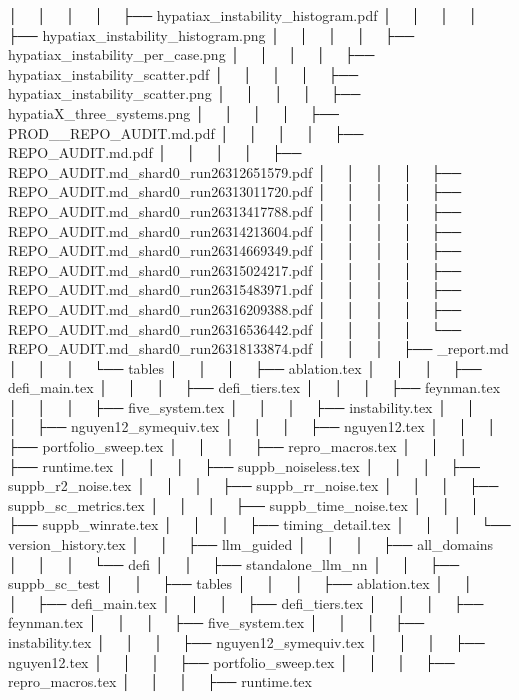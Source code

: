 │   │       │       │   ├── hypatiax_instability_histogram.pdf
│   │       │       │   ├── hypatiax_instability_histogram.png
│   │       │       │   ├── hypatiax_instability_per_case.png
│   │       │       │   ├── hypatiax_instability_scatter.pdf
│   │       │       │   ├── hypatiax_instability_scatter.png
│   │       │       │   ├── hypatiaX_three_systems.png
│   │       │       │   ├── PROD__REPO_AUDIT.md.pdf
│   │       │       │   ├── REPO_AUDIT.md.pdf
│   │       │       │   ├── REPO_AUDIT.md_shard0_run26312651579.pdf
│   │       │       │   ├── REPO_AUDIT.md_shard0_run26313011720.pdf
│   │       │       │   ├── REPO_AUDIT.md_shard0_run26313417788.pdf
│   │       │       │   ├── REPO_AUDIT.md_shard0_run26314213604.pdf
│   │       │       │   ├── REPO_AUDIT.md_shard0_run26314669349.pdf
│   │       │       │   ├── REPO_AUDIT.md_shard0_run26315024217.pdf
│   │       │       │   ├── REPO_AUDIT.md_shard0_run26315483971.pdf
│   │       │       │   ├── REPO_AUDIT.md_shard0_run26316209388.pdf
│   │       │       │   ├── REPO_AUDIT.md_shard0_run26316536442.pdf
│   │       │       │   └── REPO_AUDIT.md_shard0_run26318133874.pdf
│   │       │       ├── _report.md
│   │       │       └── tables
│   │       │           ├── ablation.tex
│   │       │           ├── defi_main.tex
│   │       │           ├── defi_tiers.tex
│   │       │           ├── feynman.tex
│   │       │           ├── five_system.tex
│   │       │           ├── instability.tex
│   │       │           ├── nguyen12_symequiv.tex
│   │       │           ├── nguyen12.tex
│   │       │           ├── portfolio_sweep.tex
│   │       │           ├── repro_macros.tex
│   │       │           ├── runtime.tex
│   │       │           ├── suppb_noiseless.tex
│   │       │           ├── suppb_r2_noise.tex
│   │       │           ├── suppb_rr_noise.tex
│   │       │           ├── suppb_sc_metrics.tex
│   │       │           ├── suppb_time_noise.tex
│   │       │           ├── suppb_winrate.tex
│   │       │           ├── timing_detail.tex
│   │       │           └── version_history.tex
│   │       ├── llm_guided
│   │       │   ├── all_domains
│   │       │   └── defi
│   │       ├── standalone_llm_nn
│   │       ├── suppb_sc_test
│   │       ├── tables
│   │       │   ├── ablation.tex
│   │       │   ├── defi_main.tex
│   │       │   ├── defi_tiers.tex
│   │       │   ├── feynman.tex
│   │       │   ├── five_system.tex
│   │       │   ├── instability.tex
│   │       │   ├── nguyen12_symequiv.tex
│   │       │   ├── nguyen12.tex
│   │       │   ├── portfolio_sweep.tex
│   │       │   ├── repro_macros.tex
│   │       │   ├── runtime.tex
